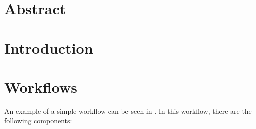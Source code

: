 \documentclass[a4paper, twocolumn]{article}
\title{\papertitle}
\author{Julian M. Kunkel
  \textit{University of Reading}
	\and
  Luciana R. Pedro
  \textit{University of Reading}
}
\date{\today}
\begin{document}
\maketitle
\thispagestyle{fancy}

\section*{Abstract}

\section{Introduction}

\section{Workflows}
\label{sec:background}

An example of a simple workflow can be seen in . In this workflow, there are the following components:
\end{document}
